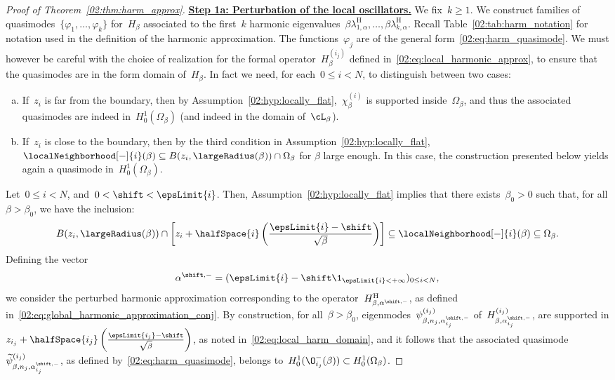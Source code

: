 \begin{proof}[Proof of Theorem~\ref{02:thm:harm_approx}]
        \noindent
        {\underline{\bf Step 1a: Perturbation of the local oscillators.}\newline}
        We fix~$k\geq 1$. We construct families of quasimodes~$\{\varphi_1,\dots,\varphi_k\}$ for~$H_\beta$ associated to the first~$k$ harmonic eigenvalues~$\beta\lambda_{1,\alpha}^{\mathrm H},\dots,\beta\lambda_{k,\alpha}^{\mathrm H}$.
        Recall Table~\ref{02:tab:harm_notation} for notation used in the definition of the harmonic approximation.
        The functions~$\varphi_{j}$ are of the general form~\eqref{02:eq:harm_quasimode}. We must however be careful with the choice of realization for the formal operator~$H_\beta^{(i_j)}$ defined in~\eqref{02:eq:local_harmonic_approx}, to ensure that the quasimodes are in the form domain of~$H_\beta$.
        In fact we need, for each~$0\leq i<N$, to distinguish between two cases:
        \begin{enumerate}[a)]
            \item{If~$z_i$ is far from the boundary, then by Assumption~\eqref{02:hyp:locally_flat},~$\chi_\beta^{(i)}$ is supported inside~$\Omega_\beta$, and thus the associated quasimodes are indeed in~$H_0^1(\Omega_\beta)$ (and indeed in the domain of~$\cL_\beta$).}
            \item{If~$z_i$ is close to the boundary, then by the third condition in Assumption~\eqref{02:hyp:locally_flat},~$\localNeighborhood[-]{i}(\beta)\subseteq B(z_i,\largeRadius(\beta)) \cap \Omega_\beta$ for $\beta$ large enough. In this case, the construction presented below yields again a quasimode in~$H_0^1(\Omega_\beta)$.}
        \end{enumerate}
        Let~$0\leq i<N$, and~$0<\shift<\epsLimit{i}$. Then, Assumption~\eqref{02:hyp:locally_flat} implies that there exists~$\beta_0>0$ such that, for all $\beta>\beta_0$, we have the inclusion:
        \[B(z_i,\largeRadius(\beta))\cap \left[z_i + \halfSpace{i}\left(\frac{\epsLimit{i}-\shift}{\sqrt\beta}\right)\right]\subseteq \localNeighborhood[-]{i}(\beta) \subseteq \Omega_\beta.\]
        Defining the vector
        \[\alpha^{\shift,-} = (\epsLimit{i} - \shift\1_{\epsLimit{i} < +\infty})_{0\leq i<N},\]
        we consider the perturbed harmonic approximation corresponding to the operator~$H_{\beta,\alpha^{\shift,-}}^{\mathrm H}$, as defined in~\eqref{02:eq:global_harmonic_approximation_conj}.
        By construction, for all~$\beta>\beta_0$, eigenmodes~$\psi_{\beta,n_j,\alpha^{\shift,-}_{i_j}}^{(i_j)}$ of~$H_{\beta,\alpha^{\shift,-}_{i_j}}^{(i_j)}$, are supported in
        $z_{i_j} + \halfSpace{i_j}\left(\frac{\epsLimit{i_j}-\shift}{\sqrt\beta}\right)$, 
        as noted in~\eqref{02:eq:local_harm_domain}, and it follows that the associated quasimode~$\widetilde\psi_{\beta,n_j,\alpha^{\shift,-}_{i_j}}^{(i_j)}$, as defined by~\eqref{02:eq:harm_quasimode}, belongs to~$H_0^1(\O_{i_j}^{-}(\beta)) \subset H_0^1(\Omega_\beta)$.
        \medskip


\end{proof}
